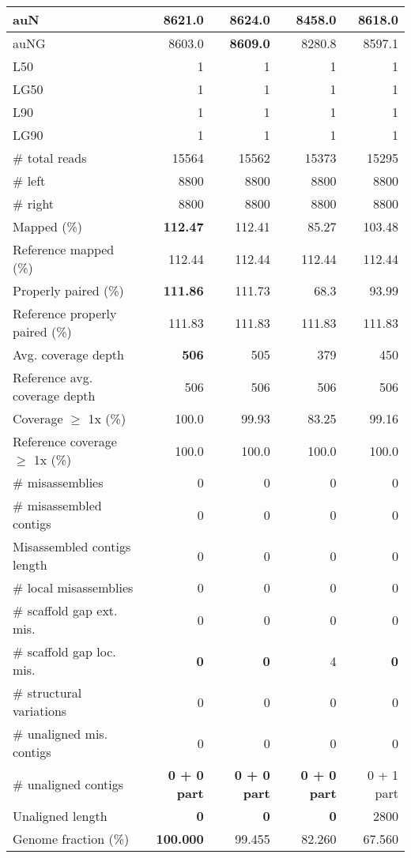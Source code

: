\documentclass[12pt,a4paper]{article}
\begin{document}
\begin{table}[ht]
\begin{center}
\begin{tabular}{|l*{4}{|r}|}
auN & 8621.0 & {\bf 8624.0} & 8458.0 & 8618.0 \\ \hline
auNG & 8603.0 & {\bf 8609.0} & 8280.8 & 8597.1 \\ \hline
L50 & 1 & 1 & 1 & 1 \\ \hline
LG50 & 1 & 1 & 1 & 1 \\ \hline
L90 & 1 & 1 & 1 & 1 \\ \hline
LG90 & 1 & 1 & 1 & 1 \\ \hline
\# total reads & 15564 & 15562 & 15373 & 15295 \\ \hline
\# left & 8800 & 8800 & 8800 & 8800 \\ \hline
\# right & 8800 & 8800 & 8800 & 8800 \\ \hline
Mapped (\%) & {\bf 112.47} & 112.41 & 85.27 & 103.48 \\ \hline
Reference mapped (\%) & 112.44 & 112.44 & 112.44 & 112.44 \\ \hline
Properly paired (\%) & {\bf 111.86} & 111.73 & 68.3 & 93.99 \\ \hline
Reference properly paired (\%) & 111.83 & 111.83 & 111.83 & 111.83 \\ \hline
Avg. coverage depth & {\bf 506} & 505 & 379 & 450 \\ \hline
Reference avg. coverage depth & 506 & 506 & 506 & 506 \\ \hline
Coverage $\geq$ 1x (\%) & 100.0 & 99.93 & 83.25 & 99.16 \\ \hline
Reference coverage $\geq$ 1x (\%) & 100.0 & 100.0 & 100.0 & 100.0 \\ \hline
\# misassemblies & 0 & 0 & 0 & 0 \\ \hline
\# misassembled contigs & 0 & 0 & 0 & 0 \\ \hline
Misassembled contigs length & 0 & 0 & 0 & 0 \\ \hline
\# local misassemblies & 0 & 0 & 0 & 0 \\ \hline
\# scaffold gap ext. mis. & 0 & 0 & 0 & 0 \\ \hline
\# scaffold gap loc. mis. & {\bf 0} & {\bf 0} & 4 & {\bf 0} \\ \hline
\# structural variations & 0 & 0 & 0 & 0 \\ \hline
\# unaligned mis. contigs & 0 & 0 & 0 & 0 \\ \hline
\# unaligned contigs & {\bf 0 + 0 part} & {\bf 0 + 0 part} & {\bf 0 + 0 part} & 0 + 1 part \\ \hline
Unaligned length & {\bf 0} & {\bf 0} & {\bf 0} & 2800 \\ \hline
Genome fraction (\%) & {\bf 100.000} & 99.455 & 82.260 & 67.560 \\ \hline

\end{tabular}
\end{center}
\end{table}
\end{document}
